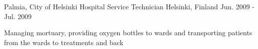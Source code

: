 \begin{cventries}
  \cventry
    {Palmia, City of Helsinki} %
    {Hospital Service Technician} %
    {Helsinki, Finland} %
    {Jun. 2009 - Jul. 2009} %
    {
      \begin{cvitems} %
        \item {Managing mortuary, providing oxygen bottles to wards and transporting
        patients from the wards to treatments and back}
      \end{cvitems}
    }

\end{cventries}

